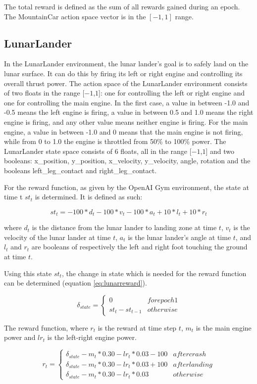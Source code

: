 The total reward is defined as the sum of all rewards gained during an epoch. The MountainCar action space vector is in the $[-1,1]$ range. 

\subsection{LunarLander}
In the LunarLander environment, the lunar lander's goal is to safely land on the lunar surface. It can do this by firing its left or right engine and controlling its overall thrust power. The action space of the LunarLander environment consists of two floats in the range [$-1$,$1$]: one for controlling the left or right engine and one for controlling the main engine. In the first case, a value in between -1.0 and -0.5 means the left engine is firing, a value in between 0.5 and 1.0 means the right engine is firing, and any other value means neither engine is firing. For the main engine, a value in between -1.0 and 0 means that the main engine is not firing, while from 0 to 1.0 the engine is throttled from 50\% to 100\% power. The LunarLander state space consists of 6 floats, all in the range [$-1$,$1$] and two booleans: x\_position, y\_position, x\_velocity, y\_velocity, angle, rotation and the booleans left\_leg\_contact and right\_leg\_contact.  

For the reward function, as given by the OpenAI Gym environment, the state at time t $st_t$ is determined. It is defined as such:

\begin{equation} 
    st_t = -100 * d_t - 100 * v_t - 100 * a_t + 10*l_t + 10*r_t
\end{equation}

where $d_t$ is the distance from the lunar lander to landing zone at time $t$, $v_t$ is the velocity of the lunar lander at time $t$, $a_t$ is the lunar lander's angle at time $t$, and $l_t$ and $r_t$ are booleans of respectively the left and right foot touching the ground at time $t$.  

Using this state $st_t$, the change in state which is needed for the reward function can be determined (equation \ref{eq:lunarreward}). 

\begin{equation}
    \delta _{state} =
    \begin{cases*}
      0  & for epoch 1 \\
      st_t - st _{t-1} & otherwise 
    \end{cases*}
\end{equation}

The reward function, where $r_t$ is the reward at time step $t$, $m_t$ is the main engine power and $lr_t$ is the left-right engine power.

\begin{equation}
\label{eq:lunarreward}
    r_t =
    \begin{cases*}
      \delta _{state} - m_t*0.30 - lr_t*0.03 -100  & after crash \\
      \delta _{state} - m_t*0.30 - lr_t*0.03 +100 & after landing \\
      \delta _{state} - m_t*0.30 - lr_t*0.03  & otherwise 
    \end{cases*}
\end{equation}
